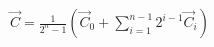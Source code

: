 \documentclass[preview]{standalone}
\begin{document}
\begin{align*}
\vec{C} = \frac{1}{2^n-1}\left(\vec{C}_0 + \sum_{i=1}^{n-1} 2^{i-1} \vec{C}_i \right)
\end{align*}
\end{document}

